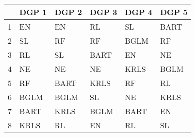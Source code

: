 \begin{table}[ht]
\centering
\begin{tabular}{rlllll}
  \hline
 & DGP 1 & DGP 2 & DGP 3 & DGP 4 & DGP 5 \\ 
  \hline
1 & EN & EN & RL & SL & BART \\ 
  2 & SL & RF & RF & BGLM & RF \\ 
  3 & RL & SL & BART & EN & NE \\ 
  4 & NE & NE & NE & KRLS & BGLM \\ 
  5 & RF & BART & KRLS & RF & RL \\ 
  6 & BGLM & BGLM & SL & NE & KRLS \\ 
  7 & BART & KRLS & BGLM & BART & EN \\ 
  8 & KRLS & RL & EN & RL & SL \\ 
   \hline
\end{tabular}
\end{table}
